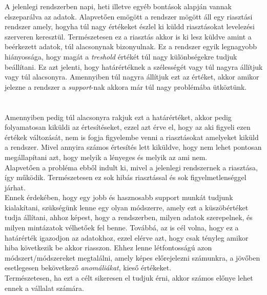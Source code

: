 A jelenlegi rendszerben napi, heti illetve egyéb bontások alapján vannak elszeparálva az adatok. Alapvetően emögött a rendszer mögött áll egy riasztási rendszer amely, hogyha túl nagy értékeket észlel ki küldd riasztásokat levelezési szerveren keresztül. Természetesen ez a riasztás akkor is ki lesz küldve amint a beérkezett adatok, túl alacsonynak bizonyulnak. Ez a rendszer egyik legnagyobb hiányossága, hogy magát a \textit{treshold} értékét túl nagy különbségekre tudjuk beállítani.
Ez azt jelenti, hogy határértéknek a szélességét vagy túl nagyra állítjuk vagy túl alacsonyra.
Amennyiben túl nagyra állítjuk ezt az értéket, akkor amikor jelezne a rendszer a \textit{support}-nak akkora már túl nagy problémába ütköztünk. 
\\
\\
\\
Amennyiben pedig túl alacsonyra rakjuk ezt a határértéket, akkor pedig folyamatosan kiküldi az értesítéseket, ezzel azt érve el, hogy az aki figyeli ezen értékek változását, nem is fogja figyelembe venni a riasztásokat amelyeket kiküld a rendszer.
Mivel annyira számos értesítés lett kiküldve, hogy nem lehet pontosan megállapítani azt, hogy melyik a lényeges és melyik az ami nem.
\\
Alapvetően a probléma ebből indult ki, mivel a  jelenlegi rendszernek a riasztása, így működik. Természetesen ez sok hibás riasztással és sok figyelmetlenséggel járhat.
\\
Ennek érdekében, hogy egy jobb és hasznosabb support munkát tudjunk kialakítani, szükségünk lenne egy olyan módszerre, amely ezt a küszöbértéket tudja állítani, ahhoz képest, hogy a rendszerben, milyen adatok szerepelnek, és milyen mintázatok vélhetőek fel benne.
Továbbá, az is cél volna, hogy ez a határérték igazodjon az adatokhoz, ezzel elérve azt, hogy csak tényleg amikor hiba következik be akkor riasszon. Ehhez lenne létfontosságú azon módszert/módszereket megtalálni, amely képes előrejelezni számunkra, a jövőben esetlegesen bekövetkező \textit{anomáliákat}, kieső értékeket.
\\
Természetesen, ha ezt a célt sikeresen el tudjuk érni, akkor számos előnye lehet ennek a vállalat számára.
\\
